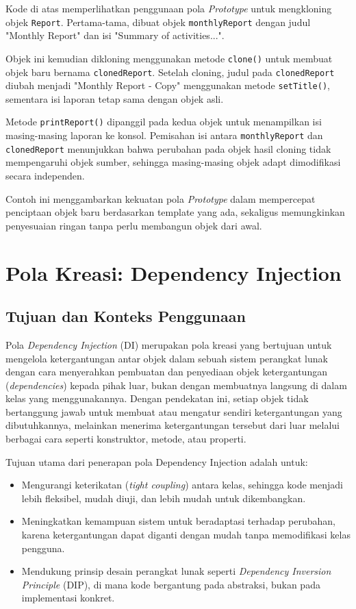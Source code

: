 Kode di atas memperlihatkan penggunaan pola \textit{Prototype} untuk mengkloning objek \texttt{Report}. Pertama-tama, dibuat objek \texttt{monthlyReport} dengan judul "Monthly Report" dan isi "Summary of activities...". 

Objek ini kemudian dikloning menggunakan metode \texttt{clone()} untuk membuat objek baru bernama \texttt{clonedReport}. Setelah cloning, judul pada \texttt{clonedReport} diubah menjadi "Monthly Report - Copy" menggunakan metode \texttt{setTitle()}, sementara isi laporan tetap sama dengan objek asli.

Metode \texttt{printReport()} dipanggil pada kedua objek untuk menampilkan isi masing-masing laporan ke konsol. Pemisahan isi antara \texttt{monthlyReport} dan \texttt{clonedReport} menunjukkan bahwa perubahan pada objek hasil cloning tidak mempengaruhi objek sumber, sehingga masing-masing objek adapt dimodifikasi secara independen.

Contoh ini menggambarkan kekuatan pola \textit{Prototype} dalam mempercepat penciptaan objek baru berdasarkan template yang ada, sekaligus memungkinkan penyesuaian ringan tanpa perlu membangun objek dari awal.

\section{Pola Kreasi: Dependency Injection}

\subsection{Tujuan dan Konteks Penggunaan}

Pola \textit{Dependency Injection} (DI) merupakan pola kreasi yang bertujuan untuk mengelola ketergantungan antar objek dalam sebuah sistem perangkat lunak dengan cara menyerahkan pembuatan dan penyediaan objek ketergantungan (\textit{dependencies}) kepada pihak luar, bukan dengan membuatnya langsung di dalam kelas yang menggunakannya. Dengan pendekatan ini, setiap objek tidak bertanggung jawab untuk membuat atau mengatur sendiri ketergantungan yang dibutuhkannya, melainkan menerima ketergantungan tersebut dari luar melalui berbagai cara seperti konstruktor, metode, atau properti.

Tujuan utama dari penerapan pola Dependency Injection adalah untuk:
\begin{itemize}
\item Mengurangi keterikatan (\textit{tight coupling}) antara kelas, sehingga kode menjadi lebih fleksibel, mudah diuji, dan lebih mudah untuk dikembangkan.
\item Meningkatkan kemampuan sistem untuk beradaptasi terhadap perubahan, karena ketergantungan dapat diganti dengan mudah tanpa memodifikasi kelas pengguna.
\item Mendukung prinsip desain perangkat lunak seperti \textit{Dependency Inversion Principle} (DIP), di mana kode bergantung pada abstraksi, bukan pada implementasi konkret.
\end{itemize}

